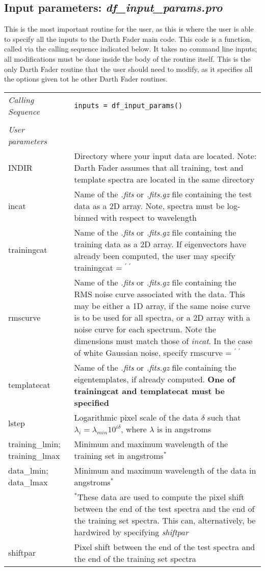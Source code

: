 \documentclass[a4paper]{article}
\newcommand{\lline}{\vspace{\baselineskip}\vspace{-\parskip}}
\newcommand{\blanks}{ $^\prime\ ^\prime$}
\begin{document}
\subsection{Input parameters: {\em df\_input\_params.pro}}

This is the most important routine for the user, as this is where the user is able to specify all the inputs to the Darth Fader main code. This code is a function, called via the calling sequence indicated below. It takes no command line inputs; all modifications must be done inside the body of the routine itself. This is the only Darth Fader routine that the user should need to modify, as it specifies all the options given tot he other Darth Fader routines. 

\lline

\noindent\begin{tabularx}{\textwidth}{LI}
{\em Calling Sequence} & \texttt{inputs = df\_input\_params()} \\
 & \\
{\em User parameters} & \\
INDIR & Directory where your input data are located. Note: Darth Fader assumes that all training, test and template spectra are located in the same directory \\
incat & Name of the {\em .fits} or {\em .fits.gz} file containing the test data as a 2D array. Note, spectra must be log-binned with respect to wavelength \\
trainingcat & Name of the {\em .fits} or {\em .fits.gz} file containing the training data as a 2D array. If eigenvectors have already been computed, the user may specify trainingcat =\blanks \\
rmscurve & Name of the {\em .fits} or {\em .fits.gz} file containing the RMS noise curve associated with the data. This may be either a 1D array, if the same noise curve is to be used for all spectra, or a 2D array with a noise curve for each spectrum. Note the dimensions must match those of {\em incat}. In the case of white Gaussian noise, specify rmscurve = \blanks\\
templatecat  & Name of the {\em .fits} or {\em .fits.gz} file containing the eigentemplates, if already computed. {\bf One of trainingcat and templatecat must be specified}\\
lstep & Logarithmic pixel scale of the data $\delta$ such that $\lambda_i = \lambda_{min}10^{i\delta}$, where $\lambda$ is in angstroms\\
training\_lmin; training\_lmax & Minimum and maximum wavelength of the training set in angstroms$^\ast$ \\
data\_lmin; data\_lmax & Minimum and maximum wavelength of the data in angstroms$^\ast$\\
 & $^\ast$These data are used to compute the pixel shift between the end of the test spectra and the end of the training set spectra. This can, alternatively, be hardwired by specifying {\em shiftpar}\\
shiftpar & Pixel shift between the end of the test spectra and the end of the training set spectra 
\end{tabularx}
\end{document}
